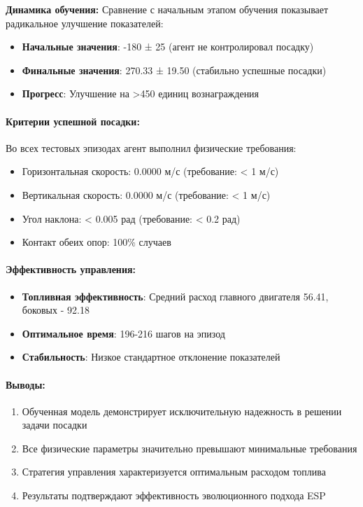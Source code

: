 \documentclass[a4paper,12pt]{article}
\begin{document}
\textbf{Динамика обучения:}
Сравнение с начальным этапом обучения показывает радикальное улучшение показателей:
\begin{itemize}
	\item \textbf{Начальные значения}: -180 ± 25 (агент не контролировал посадку)
	\item \textbf{Финальные значения}: 270.33 ± 19.50 (стабильно успешные посадки)
	\item \textbf{Прогресс}: Улучшение на >450 единиц вознаграждения
\end{itemize}

\paragraph{Критерии успешной посадки:}
Во всех тестовых эпизодах агент выполнил физические требования:
\begin{itemize}
	\item Горизонтальная скорость: 0.0000 м/с (требование: < 1 м/с)
	\item Вертикальная скорость: 0.0000 м/с (требование: < 1 м/с)
	\item Угол наклона: < 0.005 рад (требование: < 0.2 рад)
	\item Контакт обеих опор: 100\% случаев
\end{itemize}

\paragraph{Эффективность управления:}
\begin{itemize}
	\item \textbf{Топливная эффективность}: Средний расход главного двигателя 56.41, боковых - 92.18
	\item \textbf{Оптимальное время}: 196-216 шагов на эпизод
	\item \textbf{Стабильность}: Низкое стандартное отклонение показателей
\end{itemize}

\paragraph{Выводы:}
\begin{enumerate}
	\item Обученная модель демонстрирует исключительную надежность в решении задачи посадки
	\item Все физические параметры значительно превышают минимальные требования
	\item Стратегия управления характеризуется оптимальным расходом топлива
	\item Результаты подтверждают эффективность эволюционного подхода ESP
\end{enumerate}
\end{document}
